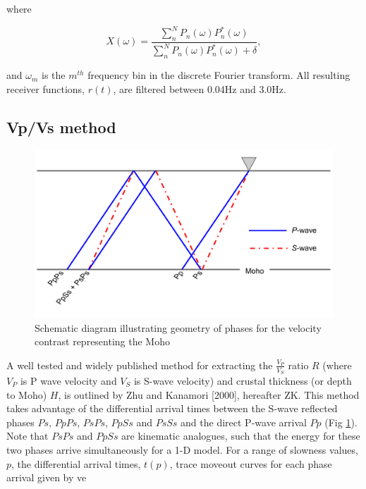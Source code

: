 \documentclass[draft, 12pt]{article}
\begin{document}
where

\begin{equation}
  X(\omega) = \frac {\sum_n^N P_n(\omega)P_n^*(\omega)} {\sum_n^N P_n(\omega)P_n^*(\omega) + \delta},
\end{equation}

and $\omega_m$ is the $m^{th}$ frequency bin in the discrete Fourier transform. All resulting receiver functions, $r(t)$, are filtered between 0.04Hz and 3.0Hz.

\subsection{Vp/Vs method} \label{section:VpVsMethod}

\begin{figure}
  \centering
    \includegraphics[width=\textwidth]{reflectedPhases}
  \caption{Schematic diagram illustrating geometry of phases for the velocity contrast representing the Moho}
  \label{fig:reflectedPhases}
\end{figure}


A well tested and widely published method for extracting the $\frac{V_P}{V_S}$ ratio $R$ (where $V_P$ is P wave velocity and $V_S$ is S-wave velocity) and crustal thickness (or depth to Moho) $H$, is outlined by Zhu and Kanamori [2000], hereafter ZK. This method takes advantage of the differential arrival times between the S-wave reflected phases $Ps$, $PpPs$, $PsPs$, $PpSs$ and $PsSs$ and the direct P-wave arrival $Pp$ (Fig \ref{fig:reflectedPhases}). Note that $PsPs$ and $PpSs$ are kinematic analogues, such that the energy for these two phases arrive simultaneously for a 1-D model. For a range of slowness values, $p$, the differential arrival times, $t(p)$, trace moveout curves for each phase arrival given by
ve
\end{document}
